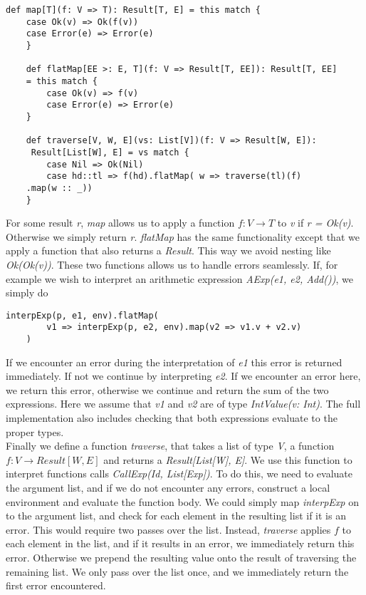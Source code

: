 \begin{lstlisting}[style=simple]
	def map[T](f: V => T): Result[T, E] = this match {
	case Ok(v) => Ok(f(v))
	case Error(e) => Error(e)
	}
	
	def flatMap[EE >: E, T](f: V => Result[T, EE]): Result[T, EE] 
	= this match {
		case Ok(v) => f(v)
		case Error(e) => Error(e)
	}
	
	def traverse[V, W, E](vs: List[V])(f: V => Result[W, E]):
	 Result[List[W], E] = vs match {
		case Nil => Ok(Nil)
		case hd::tl => f(hd).flatMap( w => traverse(tl)(f)
	.map(w :: _))
	}
\end{lstlisting}
For some result \textsl{r}, \textsl{map} allows us to apply a function $f: V \rightarrow T$ to \textsl{v} if \textsl{r = Ok(v)}. Otherwise we simply return \textsl{r}. \textsl{flatMap} has the same functionality except that we apply a function that also returns a \textsl{Result}. This way we avoid nesting like \textsl{Ok(Ok(v))}. These two functions allows us to handle errors seamlessly. If, for example we wish to interpret an arithmetic expression \textsl{AExp(e1, e2, Add())}, we simply do
\newpage 

\begin{lstlisting}[style=simple]
	interpExp(p, e1, env).flatMap(
		v1 => interpExp(p, e2, env).map(v2 => v1.v + v2.v)
	)
\end{lstlisting}
If we encounter an error during the interpretation of \textsl{e1} this error is returned immediately. If not we continue by interpreting \textsl{e2}. If we encounter an error here, we return this error, otherwise we continue and return the sum of the two expressions. Here we assume that \textsl{v1} and \textsl{v2} are of type \textsl{IntValue(v: Int)}. The full implementation also includes checking that both expressions evaluate to the proper types.
\\
Finally we define a function \textsl{traverse}, that takes a list of type \textsl{V}, a function $f: V \rightarrow Result[W, E]$ and returns a \textsl{Result[List[W], E]}. We use this function to interpret functions calls \textsl{CallExp(Id, List[Exp])}. To do this, we need to evaluate the argument list, and if we do not encounter any errors, construct a local environment and evaluate the function body. We could simply map \textsl{interpExp} on to the argument list, and check for each element in the resulting list if it is an error. This would require two passes over the list. Instead, \textsl{traverse} applies $f$ to each element in the list, and if it results in an error, we immediately return this error. Otherwise we prepend the resulting value onto the result of traversing the remaining list. We only pass over the list once, and we immediately return the first error encountered.
